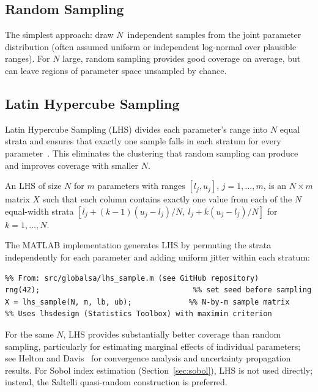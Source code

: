 \subsection{Random Sampling}

The simplest approach: draw $N$~independent samples from the joint
parameter distribution (often assumed uniform or independent log-normal
over plausible ranges). For $N$ large, random sampling provides good
coverage on average, but can leave regions of parameter space unsampled
by chance.

\subsection{Latin Hypercube Sampling}

Latin Hypercube Sampling (LHS) divides each parameter's range into
$N$ equal strata and ensures that exactly one sample falls in each
stratum for every parameter~\cite{mckay1979comparison}. This eliminates the clustering that
random sampling can produce and improves coverage with smaller $N$.

\begin{definition}
An LHS of size $N$ for $m$ parameters with ranges $[l_j, u_j]$,
$j = 1,\ldots,m$, is an $N\times m$ matrix $X$ such that each column
contains exactly one value from each of the $N$ equal-width strata
$[l_j + (k-1)(u_j-l_j)/N,\ l_j + k(u_j-l_j)/N]$ for $k = 1,\ldots,N$.
\end{definition}

The MATLAB implementation generates LHS by permuting the strata
independently for each parameter and adding uniform jitter within each stratum:

\begin{verbatim}
%% From: src/globalsa/lhs_sample.m (see GitHub repository)
rng(42);                                   %% set seed before sampling
X = lhs_sample(N, m, lb, ub);             %% N-by-m sample matrix
%% Uses lhsdesign (Statistics Toolbox) with maximin criterion
\end{verbatim}

For the same $N$, LHS provides substantially better coverage than
random sampling, particularly for estimating marginal effects of
individual parameters; see Helton and Davis~\cite{helton2003latin}
for convergence analysis and uncertainty propagation results.
For Sobol index estimation (Section~\ref{sec:sobol}),
LHS is not used directly; instead, the Saltelli quasi-random construction
is preferred.

